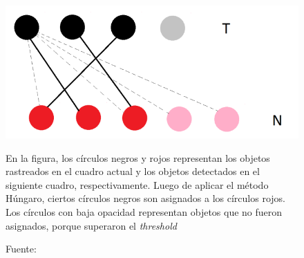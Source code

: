\documentclass[a4paper,openright,12pt]{report}
\begin{document}
\begin{figure}[H]
  \centering
    \includegraphics[width=1.0\columnwidth]{../images/hungarian-1.png}\par
  \caption{En la figura, los círculos negros y rojos representan los objetos
    rastreados en el cuadro actual y los objetos detectados en el siguiente
    cuadro, respectivamente. Luego de aplicar el método Húngaro, ciertos
    círculos negros son asignados a los círculos rojos. Los círculos con baja
    opacidad representan objetos que no fueron asignados, porque superaron el
    \textit{threshold}}
  \caption*{Fuente: \cite{szHucs2015svm}}
  \label{fig:hungarian-diagram-1}
\end{figure}
\end{document}

